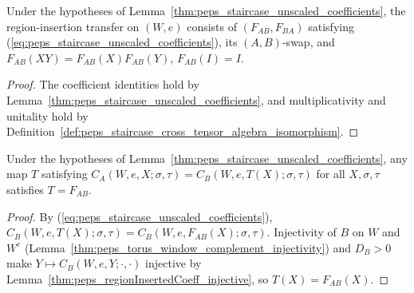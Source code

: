 \begin{definition}%
    \label{def:peps_staircase_insertion_transfer}
    \leanok
    Under the hypotheses of Lemma~\ref{thm:peps_staircase_unscaled_coefficients},
    the region-insertion transfer on $(W,e)$ consists of $(F_{AB},F_{BA})$
    satisfying (\ref{eq:peps_staircase_unscaled_coefficients}), its $(A,B)$-swap,
    and $F_{AB}(XY)=F_{AB}(X)F_{AB}(Y)$, $F_{AB}(I)=I$.
\end{definition}
\begin{proof}
    \leanok
    The coefficient identities hold by
    Lemma~\ref{thm:peps_staircase_unscaled_coefficients}, and multiplicativity
    and unitality hold by
    Definition~\ref{def:peps_staircase_cross_tensor_algebra_isomorphism}.
\end{proof}

\begin{lemma}%
    \label{thm:peps_staircase_coefficient_transfer_unique}
    \leanok
    Under the hypotheses of Lemma~\ref{thm:peps_staircase_unscaled_coefficients},
    any map $T$ satisfying
    $C_A(W,e,X;\sigma,\tau)=C_B(W,e,T(X);\sigma,\tau)$ for all $X,\sigma,\tau$
    satisfies $T=F_{AB}$.
\end{lemma}
\begin{proof}
    \leanok
    By (\ref{eq:peps_staircase_unscaled_coefficients}),
    $C_B(W,e,T(X);\sigma,\tau)=C_B(W,e,F_{AB}(X);\sigma,\tau)$. Injectivity of
    $B$ on $W$ and $W^c$ (Lemma~\ref{thm:peps_torus_window_complement_injectivity})
    and $D_B>0$ make $Y\mapsto C_B(W,e,Y;\cdot,\cdot)$ injective by
    Lemma~\ref{thm:peps_regionInsertedCoeff_injective}, so $T(X)=F_{AB}(X)$.
\end{proof}

